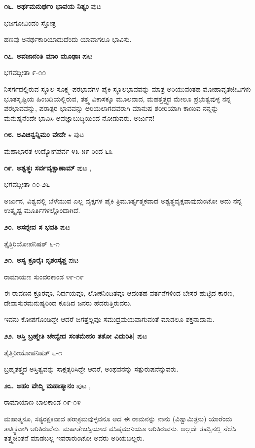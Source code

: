 \medskip
\noindent\textbf{೧೬. ಅರ್ಥಮನುರ್ಥಂ ಭಾವಯ ನಿತ್ಯಂ} \hfill ಪುಟ \pageref{55}

\hfill ಭಜಗೋವಿಂದಂ ಸ್ತೋತ್ರ

ಹಣವು ಅನರ್ಥಕಾರಿಯಾದುದೆಂದು ಯಾವಾಗಲೂ ಭಾವಿಸು.

\medskip
\noindent\textbf{೧೭. ಅವಜಾನಂತಿ ಮಾಂ ಮೂಢಾಃ} \hfill ಪುಟ \pageref{139}

\hfill ಭಗವದ್ಗೀತಾ ೯-೧೧

ನಿಸರ್ಗದಲ್ಲಿರುವ ಸ್ಥೂಲ-ಸೂಕ್ಷ್ಮ-ಪರಭಾವಗಳ ಪೈಕಿ ಸ್ಥೂಲಭಾವವನ್ನು ಮಾತ್ರ ಅರಿಯುವಂತಹ ಮೋಹಾವೃತಜೀವಿಗಳು ಭೂತಸೃಷ್ಟಿಯ ಹಿಂಬದಿಯಲ್ಲಿರುವ, ತತ್ತ್ವ ವಿಕಾಸಕ್ಕೂ ಮೂಲವಾದ, ಮಹತ್ತತ್ತ್ವದ ಮೇಲೂ ಪ್ರಭುತ್ವವುಳ್ಳ ನನ್ನ ಪರಭಾವವನ್ನು, ಪರಾತ್ಪರ ಭಾವವನ್ನು ಅರಿಯಲಾಗದವರಾಗಿ ಮಾನುಷ ಶರೀರಿಯಾಗಿ ಕಾಣುವ ನನ್ನನ್ನು  ಮನುಷ್ಯನೆಂದೇ ಭಾವಿಸಿ ಅವಜ್ಞಾಬುದ್ಧಿಯಿಂದ ನೋಡುವರು. ಅರ್ಜುನ!

\medskip
\noindent\textbf{೧೮. ಅವಿಚಿನ್ವನ್ನಿಮಂ ವೇದೇ}  $\star$ \hfill ಪುಟ \pageref{34}

\hfill ಮಹಾಭಾರತ ಉದ್ಯೋಗಪರ್ವ ೪೩-೫೯ ರಿಂದ ೬೩

\medskip
\noindent\textbf{೧೯. ಅಶ್ವತ್ಥಃ ಸರ್ವವೃಕ್ಷಾಣಾಮ್} \hfill ಪುಟ \pageref{93d},\pageref{98}

\hfill ಭಗವದ್ಗೀತಾ ೧೦-೨೬

ಅರ್ಜುನ, ವಿಶ್ವದಲ್ಲಿ ಬೆಳೆಯುವ ಎಲ್ಲ ವೃಕ್ಷಗಳ ಪೈಕಿ ತ್ರಿಮೂರ್ತ್ಯತ್ಮಕವಾದ ಅಶ್ವತ್ಥವೃಕ್ಷವಾವುದುಂಟೋ ಅದು ನನ್ನ ಉತ್ಕೃಷ್ಟ ಮೂರ್ತಿಗಳಲ್ಲೊಂದಾಗಿದೆ.

\medskip
\noindent\textbf{೨೦. ಅಸನ್ನೇವ ಸ ಭವತಿ} \hfill ಪುಟ \pageref{24a}

\hfill ತ್ತೈತ್ತಿರಿಯೋಪನಿಷತ್ ೬-೧

\medskip
\noindent\textbf{೨೧. ಅಸ್ಯ ಕ್ರೂರೈಃ ನೃಶಂಸೈಶ್ಚ} \hfill ಪುಟ \pageref{192a}

\hfill ರಾಮಾಯಣ ಸುಂದರಕಾಂಡ ೪೯-೧೯

ಈ ರಾವಣನ ಕ್ರೂರವೂ, ನಿರ್ದಯವೂ, ಲೋಕನಿಂದಿತವೂ ಆದಂತಹ ವರ್ತನೆಗಳಿಂದ ಬೇಸರ ಹುಟ್ಟಿದ ಕಾರಣ, ದೇವಾಸುರಮನುಷ್ಯರಿಂದ ಕೂಡಿದ ಜನರು ಹೆದರುತ್ತಿರುವರು.

ಇವನು ಕೋಪಗೊಂಡಿದ್ದೇ ಆದರೆ ಜಗತ್ತೆಲ್ಲವೂ ಸಮುದ್ರಮಯವಾಗುವಂತೆ ಮಾಡಲೂ ಶಕ್ತನಾದಾನು.

\medskip
\noindent\textbf{೨೨. ಆಸ್ತಿ ಬ್ರಹ್ಮೇತಿ ಚೇದ್ವೇದ ಸಂತಮೇನಂ ತತೋ ವಿದುರಿತಿ|} \hfill ಪುಟ \pageref{24}

\hfill ತೈತ್ತಿರೀಯೋಪನಿಷತ್ ೬-೧

ಬ್ರಹ್ಮತತ್ತ್ವದ ಅಸ್ತಿತ್ವವನ್ನು ಸಾಕ್ಷತ್ಕರಿಸಿದ್ದೇ ಆದರೆ, ಅಂಥವನನ್ನು ಸತ್ಪುರುಷನೆನ್ನುವರು.

\medskip
\noindent\textbf{೨೩. ಅಹಂ ವೇದ್ಮಿ ಮಹಾತ್ಮಾನಂ} \hfill ಪುಟ \pageref{195},\pageref{251a}

\hfill ರಾಮಾಯಾಣ ಬಾಲಕಾಂಡ ೧೯-೧೪

ಮಹಾತ್ಮನೂ, ಸತ್ಯರಕ್ಷಕವಾದ ಪರಾಕ್ರಮವುಳ್ಳವನೂ ಆದ ಈ ರಾಮನನ್ನು ನಾನು (ವಿಶ್ವಾಮಿತ್ರನು) ಯಾರೆಂದು ತಾತ್ತ್ವಿಕವಾಗಿ ಅರಿತಿರುವೆನು. ಮಹಾತೇಜಸ್ವಿಯಾದ ವಸಿಷ್ಠಮುನಿಯೂ ಅರಿತಿರುವನು. ಅಲ್ಲದೇ ತಪಸ್ಸಿನಲ್ಲಿ ನೆಲೆಸಿ ತತ್ತ್ವಚಿಂತನೆ ಮಾಡಬಲ್ಲ ಇವರಾರುಂಟೋ ಅವರು ಅರಿಯಬಲ್ಲರು. 

